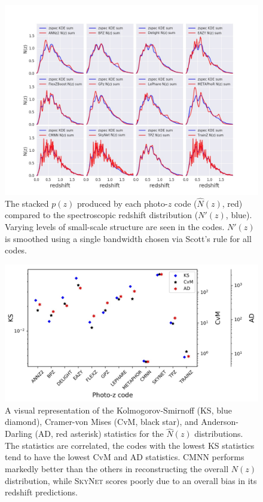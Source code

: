 \begin{figure}
\centering
\includegraphics[width=\textwidth]{fig/NZsumplot_12codes.jpg}
\caption{The stacked $p(z)$ produced by each photo-$z$ code ($\hat{N}(z)$, red) compared to the spectroscopic redshift distribution ($N'(z)$, blue).  Varying levels of small-scale structure are seen in the codes.  $N'(z)$ is smoothed using a single bandwidth chosen via Scott's rule for all codes.} \label{fig:nz}
\end{figure}

\begin{figure}
\centering
\includegraphics[width=\textwidth]{fig/KSvsCvMvsAD_NZ_withnull_jpg.jpg}
\caption{A visual representation of the Kolmogorov-Smirnoff (KS, blue diamond), Cramer-von Mises (CvM, black star), and Anderson-Darling (AD, red asterisk) statistics for the $\hat{N}(z)$ distributions. The statistics are correlated, the codes with the lowest KS statistics tend to have the lowest CvM and AD statistics.  \textsc{CMNN} performs markedly better than the others in reconstructing the overall $N(z)$ distribution, while \textsc{SkyNet} scores poorly due to an overall bias in its redshift predictions.} \label{fig:nz_stats}
\end{figure}

